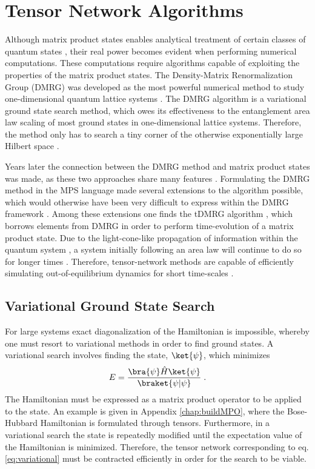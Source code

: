 \chapter{Tensor Network Algorithms}
Although matrix product states enables analytical treatment of certain classes of quantum states \cite{Baxter1968,Affleck1987}, their real power becomes evident when performing numerical computations. These computations require algorithms capable of exploiting the properties of the matrix product states. The Density-Matrix Renormalization Group (DMRG) was developed as the most powerful numerical method to study one-dimensional quantum lattice systems \cite{White1992,White1993}. The DMRG algorithm is a variational ground state search method, which owes its effectiveness to the entanglement area law scaling of most ground states in one-dimensional lattice systems. Therefore, the method only has to search a tiny corner of the otherwise exponentially large Hilbert space \cite{Cramer}.

Years later the connection between the DMRG method and matrix product states was made, as these two approaches share many features \cite{Ostlund1995, Dukelsky1998}. Formulating the DMRG method in the MPS language made several extensions to the algorithm possible, which would otherwise have been very difficult to express within the DMRG framework \cite{schollwock}. Among these extensions one finds the tDMRG algorithm \cite{Vidal2003,Vidal2004,Daley2004}, which borrows elements from DMRG in order to perform time-evolution of a matrix product state.
Due to the light-cone-like propagation of information within the quantum system \cite{Lauchli2008,Bravyi2006}, a system initially following an area law will continue to do so for longer times \cite{Bravyi2006,Eisert2006}. Therefore, tensor-network methods are capable of efficiently simulating out-of-equilibrium dynamics for short time-scales \cite{Eisert2015}.


\section{Variational Ground State Search}
For large systems exact diagonalization of the Hamiltonian is impossible, whereby one must resort to variational methods in order to find ground states. A variational search involves finding the state, $\ket{\psi}$, which minimizes
\begin{equation}
	E = \frac{\bra{\psi} \hat{H} \ket{\psi}}{\braket{\psi | \psi}} \; .
	\label{eq:variational}
\end{equation}
The Hamiltonian must be expressed as a matrix product operator to be applied to the state. An example is given in Appendix \ref{chap:buildMPO}, where the Bose-Hubbard Hamiltonian is formulated through tensors. Furthermore, in a variational search the state is repeatedly modified until the expectation value of the Hamiltonian is minimized. Therefore, the tensor network corresponding to eq. \ref{eq:variational} must be contracted efficiently in order for the search to be viable.



